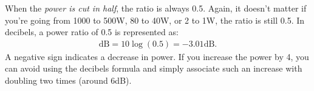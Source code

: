 \documentclass[../../document]{subfiles}
\begin{document}
When the \emph{power is cut in half}, the ratio is always 0.5. Again, it
doesn’t matter if you’re going from 1000 to 500\unit{\watt}, 80 to
40\unit{\watt}, or 2 to 1\unit{\watt}, the ratio is still 0.5. In decibels, a
power ratio of 0.5 is represented as:
\begin{gather}
	\unit{\deci\bel} = 10\log\left(0.5\right) = -3.01\unit{\deci\bel}.
\end{gather}
A negative sign indicates a decrease in power. If you increase the power by 4,
you can avoid using the decibels formula and simply associate such an increase
with doubling two times (around 6\unit{\deci\bel}).
\cite{practical_electronics}
\end{document}
